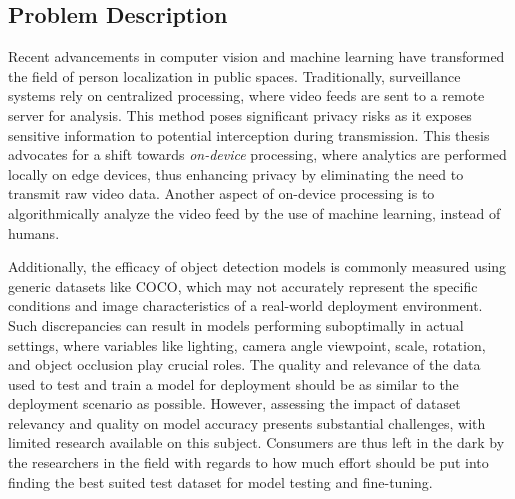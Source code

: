 \newpage
\subsection{Problem Description}
\label{sec:problem_description}
Recent advancements in computer vision and machine learning have transformed the field of person localization in public spaces. Traditionally, surveillance systems rely on centralized processing, where video feeds are sent to a remote server for analysis. This method poses significant privacy risks as it exposes sensitive information to potential interception during transmission. This thesis advocates for a shift towards \textit{on-device} processing, where analytics are performed locally on edge devices, thus enhancing privacy by eliminating the need to transmit raw video data. Another aspect of on-device processing is to algorithmically analyze the video feed by the use of machine learning, instead of humans.

Additionally, the efficacy of object detection models is commonly measured using generic datasets like COCO, which may not accurately represent the specific conditions and image characteristics of a real-world deployment environment. Such discrepancies can result in models performing suboptimally in actual settings, where variables like lighting, camera angle viewpoint, scale, rotation, and object occlusion play crucial roles. The quality and relevance of the data used to test and train a model for deployment should be as similar to the deployment scenario as possible. However, assessing the impact of dataset relevancy and quality on model accuracy presents substantial challenges, with limited research available on this subject. Consumers are thus left in the dark by the researchers in the field with regards to how much effort should be put into finding the best suited test dataset for model testing and fine-tuning.


